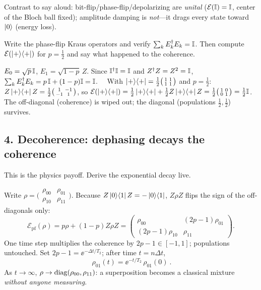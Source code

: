 \documentclass[11pt]{article}
\begin{document}
Contrast to say aloud: bit-flip/phase-flip/depolarizing are \emph{unital}
($\mathcal E(\mathbb{I})=\mathbb{I}$, center of the Bloch ball fixed); amplitude damping is
\emph{not}---it drags every state toward $\ket0$ (energy loss).

\begin{inclass}\label{ic:pf}
Write the phase-flip Kraus operators and verify $\sum_k E_k^{\dagger} E_k=\mathbb{I}$. Then compute
$\mathcal E(\ket{+}\!\bra{+})$ for $p=\tfrac12$ and say what happened to the coherence.
\end{inclass}
\begin{answer}
$E_0=\sqrt p\,\mathbb{I}$, $E_1=\sqrt{1-p}\,Z$. Since $\mathbb{I}^{\dagger}\mathbb{I}=\mathbb{I}$ and $Z^{\dagger} Z=Z^2=\mathbb{I}$,
$\sum_k E_k^{\dagger} E_k=p\,\mathbb{I}+(1-p)\mathbb{I}=\mathbb{I}$. \checkmark\ \ With
$\ket{+}\!\bra{+}=\tfrac12\big(\begin{smallmatrix}1&1\\1&1\end{smallmatrix}\big)$ and $p=\tfrac12$:
$Z\ket{+}\!\bra{+}Z=\tfrac12\big(\begin{smallmatrix}1&-1\\-1&1\end{smallmatrix}\big)$, so
$\mathcal E(\ket{+}\!\bra{+})=\tfrac12\ket{+}\!\bra{+}+\tfrac12 Z\ket{+}\!\bra{+} Z=\tfrac12\big(\begin{smallmatrix}1&0\\0&1\end{smallmatrix}\big)=\tfrac12\mathbb{I}$.
The off-diagonal (coherence) is wiped out; the diagonal (populations $\tfrac12,\tfrac12$) survives.
\end{answer}

\subsection*{4. Decoherence: dephasing decays the coherence }
This is the physics payoff. Derive the exponential decay live.

\begin{board}
Write $\rho=\big(\begin{smallmatrix}\rho_{00}&\rho_{01}\\ \rho_{10}&\rho_{11}\end{smallmatrix}\big)$.
Because $Z\ket0\!\bra1 Z=-\ket0\!\bra1$, $Z\rho Z$ flips the sign of the off-diagonals only:
\[
  \mathcal E_{\mathrm{pf}}(\rho)=p\rho+(1-p)Z\rho Z
  =\begin{pmatrix}\rho_{00}&(2p-1)\rho_{01}\\ (2p-1)\rho_{10}&\rho_{11}\end{pmatrix}.
\]
One time step multiplies the coherence by $2p-1\in[-1,1]$; populations untouched.
Set $2p-1=\ee^{-\Delta t/T_2}$; after time $t=n\Delta t$,
\[
  \boxed{\ \rho_{01}(t)=\ee^{-t/T_2}\,\rho_{01}(0)\ }.
\]
As $t\to\infty$, $\rho\to\operatorname{diag}(\rho_{00},\rho_{11})$: a superposition becomes a
classical mixture \emph{without anyone measuring}.
\end{board}
\end{document}
